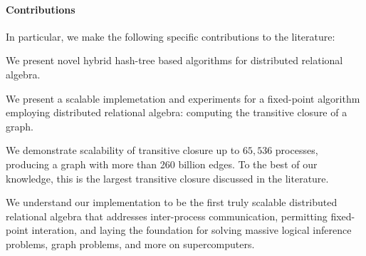 \paragraph{Contributions} In particular, we make the following specific contributions to the literature:
\begin{tightenumerate}
	\item We present novel hybrid hash-tree based algorithms for distributed relational algebra.
	\item We present a scalable implemetation and experiments for a fixed-point algorithm employing distributed relational algebra: computing the transitive closure of a graph.
	\item We demonstrate scalability of transitive closure up to $65,\!536$ processes, producing a graph with more than 260 billion edges. To the best of our knowledge, this is the largest transitive closure discussed in the literature. 
\end{tightenumerate}

We understand our implementation to be the first truly scalable distributed relational algebra that addresses inter-process communication, permitting fixed-point interation, and laying the foundation for solving massive logical inference problems, graph problems, and more on supercomputers.





